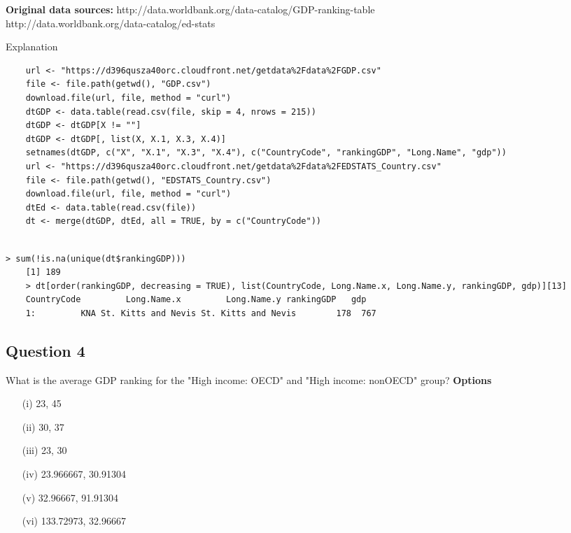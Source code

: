 \documentclass[]{article}
\begin{document}
\textbf{Original data sources:} 
http://data.worldbank.org/data-catalog/GDP-ranking-table \\
http://data.worldbank.org/data-catalog/ed-stats\\




\newpage

Explanation
\begin{framed}
	\begin{verbatim}
	url <- "https://d396qusza40orc.cloudfront.net/getdata%2Fdata%2FGDP.csv"
	file <- file.path(getwd(), "GDP.csv")
	download.file(url, file, method = "curl")
	dtGDP <- data.table(read.csv(file, skip = 4, nrows = 215))
	dtGDP <- dtGDP[X != ""]
	dtGDP <- dtGDP[, list(X, X.1, X.3, X.4)]
	setnames(dtGDP, c("X", "X.1", "X.3", "X.4"), c("CountryCode", "rankingGDP", "Long.Name", "gdp"))
	url <- "https://d396qusza40orc.cloudfront.net/getdata%2Fdata%2FEDSTATS_Country.csv"
	file <- file.path(getwd(), "EDSTATS_Country.csv")
	download.file(url, file, method = "curl")
	dtEd <- data.table(read.csv(file))
	dt <- merge(dtGDP, dtEd, all = TRUE, by = c("CountryCode"))
	
	\end{verbatim}
\end{framed}

\begin{verbatim}
> sum(!is.na(unique(dt$rankingGDP)))
	[1] 189
	> dt[order(rankingGDP, decreasing = TRUE), list(CountryCode, Long.Name.x, Long.Name.y, rankingGDP, gdp)][13]
	CountryCode         Long.Name.x         Long.Name.y rankingGDP   gdp
	1:         KNA St. Kitts and Nevis St. Kitts and Nevis        178  767 
\end{verbatim}
\newpage
\subsection*{Question 4}
What is the average GDP ranking for the "High income: OECD" and "High income: nonOECD" group?
\textbf{Options}
\begin{itemize}
\item[(i)]  23, 45
\item[(ii)] 30, 37
\item[(iii)] 23, 30
\item[(iv)] 23.966667, 30.91304
\item[(v)] 32.96667, 91.91304
\item[(vi)] 133.72973, 32.96667
\end{itemize}
\end{document}
